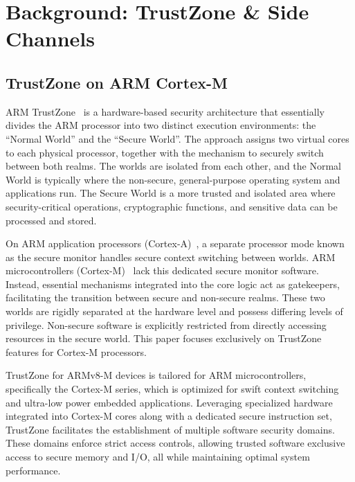 \section{Background: TrustZone \& Side Channels} \label{sect:problem}

\subsection{TrustZone on ARM Cortex-M}

ARM TrustZone~\cite{DemystifyingAT, TZArchitecture} is a hardware-based
security architecture that essentially divides the ARM processor into two
distinct execution environments: the ``Normal World'' and the ``Secure
World''. The approach assigns two virtual cores to each physical processor,
together with the mechanism to securely switch between both realms. The
worlds are isolated from each other, and the Normal World is typically
where the non-secure, general-purpose operating system and applications
run. The Secure World is a more trusted and isolated area where
security-critical operations, cryptographic functions, and sensitive data
can be processed and stored.

On ARM application processors (Cortex-A)~\cite{TZA}, a separate processor
mode known as the secure monitor handles secure context switching between
worlds. ARM microcontrollers (Cortex-M)~\cite{TZM} lack this dedicated
secure monitor software. Instead, essential mechanisms integrated into the
core logic act as gatekeepers, facilitating the transition between secure
and non-secure realms. These two worlds are rigidly separated at the
hardware level and possess differing levels of privilege. Non-secure
software is explicitly restricted from directly accessing resources in the
secure world. This paper focuses exclusively on TrustZone features for
Cortex-M processors.

TrustZone for ARMv8-M devices is tailored for ARM
microcontrollers, specifically the Cortex-M series, which is optimized for
swift context switching and ultra-low power embedded applications.
Leveraging specialized hardware integrated into Cortex-M cores along with a
dedicated secure instruction set, TrustZone facilitates the establishment
of multiple software security domains. These domains enforce strict access
controls, allowing trusted software exclusive access to secure memory and
I/O, all while maintaining optimal system performance.

